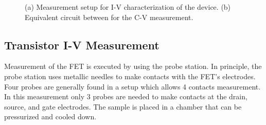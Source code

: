 \documentclass[11pt,a4paper]{report}
\begin{document}
\begin{figure}[!t]
    \begin{minipage}{.5\linewidth}
    \centering
    \end{minipage}
    \begin{minipage}{.5\linewidth}
    \centering
    
    \end{minipage}\par\medskip
    \caption{(a) Measurement setup for I-V characterization of the device. (b) Equivalent circuit between for the C-V measurement.}
    \label{fig:Measurement Layout}
\end{figure}


\subsection{Transistor I-V Measurement}
Measurement of the FET is executed by using the probe station. In principle, the probe station uses metallic needles to make contacts with the FET's electrodes. Four probes are generally found in a setup which allows 4 contacts measurement. In this measurement only 3 probes are needed to make contacts at the drain, source, and gate electrodes. The sample is placed in a chamber that can be pressurized and cooled down.
\end{document}
